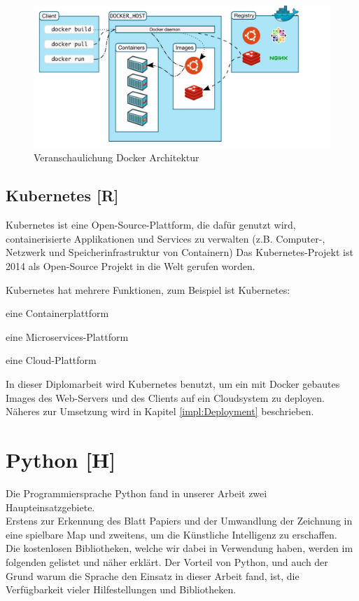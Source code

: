 \begin{figure}[H]
    \centering
    \includegraphics[scale=0.6]{pics/docker architecture.PNG}
    \caption{Veranschaulichung Docker Architektur \cite{docker_architektur}}
\end{figure}


\subsection{Kubernetes [R]}
Kubernetes ist eine Open-Source-Plattform, die dafür genutzt wird, containerisierte Applikationen und Services zu verwalten (z.B. Computer-, Netzwerk und Speicherinfrastruktur von Containern)
Das Kubernetes-Projekt ist 2014 als Open-Source Projekt in die Welt gerufen worden.

Kubernetes hat mehrere Funktionen, zum Beispiel ist Kubernetes:
\begin{compactitem}
    \item eine Containerplattform
    \item eine Microservices-Plattform
    \item eine Cloud-Plattform
\end{compactitem}
\cite{kubernetes}

In dieser Diplomarbeit wird Kubernetes benutzt, um ein mit Docker gebautes Images des Web-Servers und des Clients auf ein Cloudsystem zu deployen. Näheres zur Umsetzung wird in Kapitel \ref{impl:Deployment} beschrieben.


\section{Python [H]}
Die Programmiersprache Python
fand in unserer Arbeit zwei Haupteinsatzgebiete. \\
Erstens zur Erkennung des Blatt Papiers und der Umwandlung der Zeichnung in eine spielbare Map
und zweitens, um die Künstliche Intelligenz zu erschaffen. \\
Die kostenlosen Bibliotheken, welche wir dabei in Verwendung haben, werden im folgenden gelistet und näher
erklärt.
Der Vorteil von Python, und auch der Grund warum die Sprache den Einsatz in dieser Arbeit fand,
ist, die Verfügbarkeit vieler Hilfestellungen und Bibliotheken.

